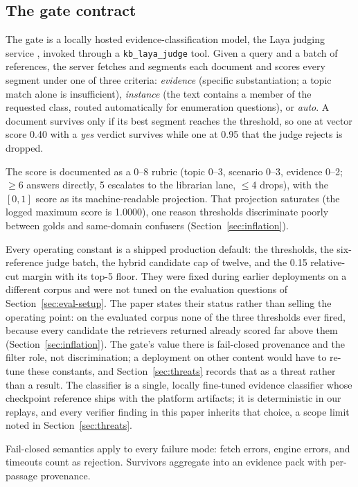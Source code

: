 \subsection{The gate contract}
\label{sec:gate}

The gate is a locally hosted evidence-classification model, the Laya judging
service \cite{laya}, invoked through a \texttt{kb\_laya\_judge} tool. Given a
query and a batch of references, the server fetches and segments each document
and scores every segment under one of three criteria: \emph{evidence} (specific
substantiation; a topic match alone is insufficient), \emph{instance} (the text
contains a member of the requested class, routed automatically for enumeration
questions), or \emph{auto}. A document survives only if its best segment reaches
the threshold, so one at vector score 0.40 with a \emph{yes} verdict survives
while one at 0.95 that the judge rejects is dropped.

The score is documented as a 0--8 rubric (topic 0--3, scenario 0--3,
evidence 0--2; $\geq$6 answers directly, 5 escalates to the librarian lane,
$\leq$4 drops), with the $[0,1]$ score as its machine-readable projection. That
projection saturates (the logged maximum score is 1.0000), one reason thresholds
discriminate poorly between golds and same-domain confusers
(Section~\ref{sec:inflation}).

Every operating constant is a shipped production default: the thresholds, the
six-reference judge batch, the hybrid candidate cap of twelve, and the 0.15
relative-cut margin with its top-5 floor. They were fixed during earlier
deployments on a different corpus and were not tuned on the evaluation questions
of Section~\ref{sec:eval-setup}. The paper states their status rather than
selling the operating point: on the evaluated corpus none of the three
thresholds ever fired, because every candidate the retrievers returned already
scored far above them (Section~\ref{sec:inflation}). The gate's value there is
fail-closed provenance and the filter role, not discrimination; a deployment on
other content would have to re-tune these constants, and Section~\ref{sec:threats}
records that as a threat rather than a result. The classifier is a single, locally fine-tuned
evidence classifier whose checkpoint reference ships with the platform
artifacts; it is deterministic in our replays, and every verifier finding in this
paper inherits that choice, a scope limit noted in Section~\ref{sec:threats}.

Fail-closed semantics apply to every failure mode: fetch errors, engine errors,
and timeouts count as rejection. Survivors aggregate into an evidence pack with
per-passage provenance.

